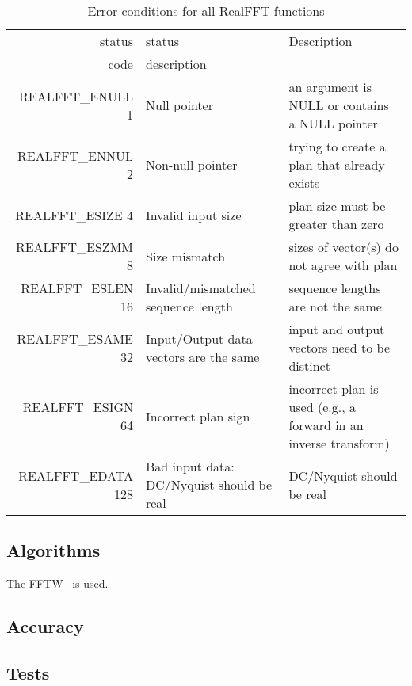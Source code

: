 \documentclass{article}
\begin{document}
\begin{table}
\begin{tabular}{|r|l|p{2in}|}\hline
status  & status          & Description\\
code    & description     & \\\hline
REALFFT\_ENULL 1   & Null pointer
  & an argument is NULL or contains a NULL pointer\\
REALFFT\_ENNUL 2   & Non-null pointer
  & trying to create a plan that already exists \\
REALFFT\_ESIZE 4   & Invalid input size
  & plan size must be greater than zero\\
REALFFT\_ESZMM 8   & Size mismatch
  & sizes of vector(s) do not agree with plan\\
REALFFT\_ESLEN 16  & Invalid/mismatched sequence length
  & sequence lengths are not the same\\
REALFFT\_ESAME 32  & Input/Output data vectors are the same
  & input and output vectors need to be distinct\\
REALFFT\_ESIGN 64  & Incorrect plan sign
  & incorrect plan is used (e.g., a forward in an inverse transform)\\
REALFFT\_EDATA 128 & Bad input data: DC/Nyquist should be real
  & DC/Nyquist should be real \\
\hline
\end{tabular}
\caption{Error conditions for all RealFFT functions}\label{tbl:CV}
\end{table}
                                
\subsection{Algorithms}

The FFTW~\cite{fj:1998} is used.


\subsection{Accuracy}



\subsection{Tests}

\end{document}
